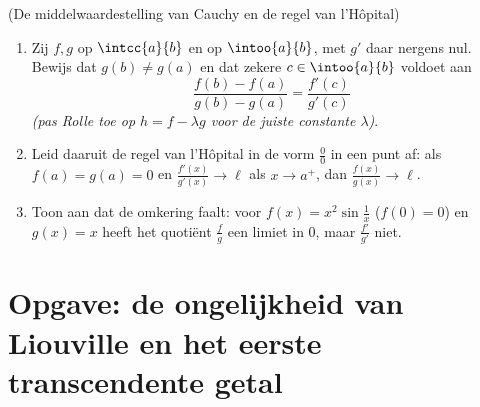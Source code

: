 \begin{exercise}[$\star\star\star$]\label{exo:b1:derivative:12}
(De middelwaardestelling van Cauchy en de regel van l'Hôpital)
\begin{enumerate}
  \item Zij $f, g$  op $\intcc{a}{b}$ en  op
        $\intoo{a}{b}$, met $g'$ daar nergens nul. Bewijs dat
        $g(b) \neq g(a)$ en dat zekere $c \in \intoo{a}{b}$
        voldoet aan
        \[
        \frac{f(b) - f(a)}{g(b) - g(a)} = \frac{f'(c)}{g'(c)}
        \]
        \emph{(pas Rolle toe op $h = f - \lambda g$ voor de juiste
        constante $\lambda$)}.
  \item Leid daaruit de regel van l'Hôpital in de vorm $\frac00$
        in een punt af: als $f(a) = g(a) = 0$ en
        $\frac{f'(x)}{g'(x)} \to \ell$ als $x \to a^+$, dan
        $\frac{f(x)}{g(x)} \to \ell$.
  \item Toon aan dat de omkering faalt: voor $f(x) =
        x^2\sin\frac1x$ ($f(0) = 0$) en $g(x) = x$ heeft het
        quotiënt $\frac{f}{g}$ een limiet in $0$, maar
        $\frac{f'}{g'}$ niet.
\end{enumerate}
\end{exercise}

\section{Opgave: de ongelijkheid van Liouville en het eerste
transcendente getal}

